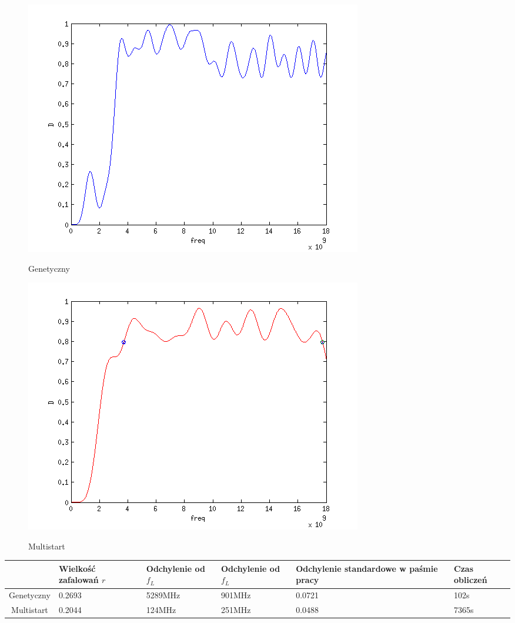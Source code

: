 \documentclass[10pt,a4paper]{article}
\begin{document}
\begin{figure}[H]
  \caption{Genetyczny}
  \centering
    \includegraphics[scale=0.75]{genetyczny}
  \label{fig:genetyczny_wykres}
\end{figure}
\begin{figure}[H]
  \caption{Multistart}
  \centering
    \includegraphics[scale=0.75]{multistart}
  \label{fig:multistart_wykres}
\end{figure}

\begin{tabular}{|c|p{2cm}|p{2cm}|p{2cm}|p{2cm}|p{2cm}|}
\hline 
 & Wielkość \newline zafalowań $r$ & Odchylenie od $f_L$ & Odchylenie od $f_L$ & Odchylenie standardowe w paśmie pracy & Czas \newline obliczeń \\ 
\hline 
Genetyczny & 0.2693 &  5289MHz & 901MHz & 0.0721 & 102s \\ 
\hline 
Multistart & 0.2044 &  124MHz & 251MHz & 0.0488 & 7365s \\ 
\hline 
\end{tabular} 
\end{document}

